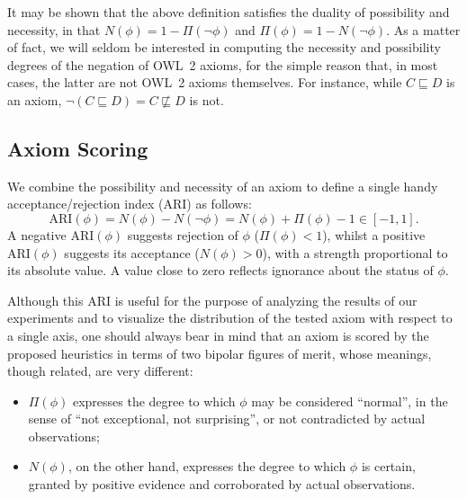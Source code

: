 \documentclass{llncs}
\begin{document}
It may be shown that the above definition satisfies the duality of
possibility and necessity, in that $N(\phi) = 1 - \Pi(\neg\phi)$ and
$\Pi(\phi) = 1 - N(\neg\phi)$.
As a matter of fact, we will seldom be interested in computing the necessity and
possibility degrees of the negation of OWL~2 axioms, for the simple reason that, in most cases,
the latter are not OWL~2 axioms themselves. For instance, while $C \sqsubseteq D$
is an axiom, $\neg(C \sqsubseteq D) = C \not\sqsubseteq D$ is not.



\subsection{Axiom Scoring}
We combine the possibility and necessity of an axiom to define
a single handy acceptance/rejection index (ARI) as follows:
\begin{equation}\label{eq:ARI}
  \mathrm{ARI}(\phi) = N(\phi) - N(\neg\phi) = N(\phi) + \Pi(\phi) - 1 \in [-1, 1].
\end{equation}
A negative $\mathrm{ARI}(\phi)$ suggests rejection of $\phi$ ($\Pi(\phi)<1$),
whilst a positive $\mathrm{ARI}(\phi)$ suggests its acceptance ($N(\phi)>0$),
with a strength proportional to its absolute value. A value close to zero
reflects ignorance about the status of $\phi$.

Although this ARI is useful for the purpose of analyzing the results of our
experiments and to visualize the distribution of the tested axiom with respect
to a single axis, one should always bear in mind that an axiom is scored by
the proposed heuristics in terms of two bipolar figures of merit,
whose meanings, though related, are very different:
\begin{itemize}
\item $\Pi(\phi)$ expresses the degree to which $\phi$ may be considered ``normal'',
  in the sense of ``not exceptional, not surprising'', or not contradicted by
  actual observations;
\item $N(\phi)$, on the other hand, expresses the degree to which $\phi$ is
  certain, granted by positive evidence and corroborated by actual observations.
\end{itemize}
\end{document}
